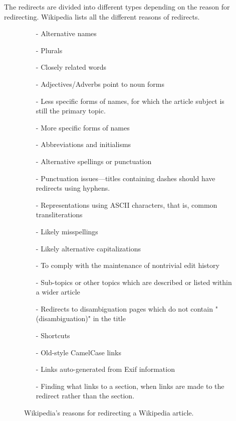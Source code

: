 The redirects are divided into different types depending on the reason for redirecting. Wikipedia lists all the different reasons of redirects. \cite{wiki:redirect} 
\begin{figure}[h]
\begin{itemize}[noitemsep]
\item[-] Alternative names 
\item[-] Plurals 
\item[-] Closely related words 
\item[-] Adjectives/Adverbs point to noun forms 
\item[-] Less specific forms of names, for which the article subject is still the primary topic. 
\item[-] More specific forms of names 
\item[-] Abbreviations and initialisms 
\item[-] Alternative spellings or punctuation
\item[-] Punctuation issues—titles containing dashes should have redirects using hyphens.
\item[-] Representations using ASCII characters, that is, common transliterations 
\item[-] Likely misspellings
\item[-] Likely alternative capitalizations 
\item[-] To comply with the maintenance of nontrivial edit history
\item[-] Sub-topics or other topics which are described or listed within a wider article
\item[-] Redirects to disambiguation pages which do not contain "(disambiguation)" in the title
\item[-] Shortcuts
\item[-] Old-style CamelCase links 
\item[-] Links auto-generated from Exif information 
\item[-] Finding what links to a section, when links are made to the redirect rather than the section.
\end{itemize}
\caption{Wikipedia's reasons for redirecting a Wikipedia article.}
\label{fig:redirectreasons}
\end{figure}


